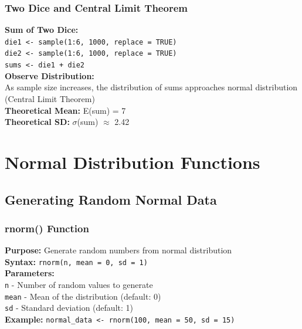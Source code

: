 \documentclass[11pt,a4paper]{article}
\begin{document}
\subsubsection{Two Dice and Central Limit Theorem}

\begin{probabilitybox}
\textbf{Sum of Two Dice:}\\
\texttt{die1 <- sample(1:6, 1000, replace = TRUE)}\\
\texttt{die2 <- sample(1:6, 1000, replace = TRUE)}\\
\texttt{sums <- die1 + die2}\\[0.3cm]
\textbf{Observe Distribution:}\\
As sample size increases, the distribution of sums approaches normal distribution (Central Limit Theorem)\\[0.3cm]
\textbf{Theoretical Mean:} E(sum) = 7\\
\textbf{Theoretical SD:} $\sigma$(sum) $\approx$ 2.42
\end{probabilitybox}

\section{Normal Distribution Functions}

\subsection{Generating Random Normal Data}

\subsubsection{rnorm() Function}

\begin{formulabox}
\textbf{Purpose:} Generate random numbers from normal distribution\\[0.3cm]
\textbf{Syntax:} \texttt{rnorm(n, mean = 0, sd = 1)}\\[0.3cm]
\textbf{Parameters:}\\
\texttt{n} - Number of random values to generate\\
\texttt{mean} - Mean of the distribution (default: 0)\\
\texttt{sd} - Standard deviation (default: 1)\\[0.3cm]
\textbf{Example:} \texttt{normal\_data <- rnorm(100, mean = 50, sd = 15)}
\end{formulabox}
\end{document}
